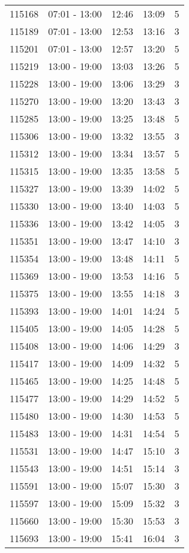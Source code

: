 \documentclass{article}
\begin{document}
\begin{tabular}{llccc}
115168 & 07:01 - 13:00 & 12:46 & 13:09 & 5 \\
115189 & 07:01 - 13:00 & 12:53 & 13:16 & 3 \\
115201 & 07:01 - 13:00 & 12:57 & 13:20 & 5 \\
115219 & 13:00 - 19:00 & 13:03 & 13:26 & 5 \\
115228 & 13:00 - 19:00 & 13:06 & 13:29 & 3 \\
115270 & 13:00 - 19:00 & 13:20 & 13:43 & 3 \\
115285 & 13:00 - 19:00 & 13:25 & 13:48 & 5 \\
115306 & 13:00 - 19:00 & 13:32 & 13:55 & 3 \\
115312 & 13:00 - 19:00 & 13:34 & 13:57 & 5 \\
115315 & 13:00 - 19:00 & 13:35 & 13:58 & 5 \\
115327 & 13:00 - 19:00 & 13:39 & 14:02 & 5 \\
115330 & 13:00 - 19:00 & 13:40 & 14:03 & 5 \\
115336 & 13:00 - 19:00 & 13:42 & 14:05 & 3 \\
115351 & 13:00 - 19:00 & 13:47 & 14:10 & 3 \\
115354 & 13:00 - 19:00 & 13:48 & 14:11 & 5 \\
115369 & 13:00 - 19:00 & 13:53 & 14:16 & 5 \\
115375 & 13:00 - 19:00 & 13:55 & 14:18 & 3 \\
115393 & 13:00 - 19:00 & 14:01 & 14:24 & 5 \\
115405 & 13:00 - 19:00 & 14:05 & 14:28 & 5 \\
115408 & 13:00 - 19:00 & 14:06 & 14:29 & 3 \\
115417 & 13:00 - 19:00 & 14:09 & 14:32 & 5 \\
115465 & 13:00 - 19:00 & 14:25 & 14:48 & 5 \\
115477 & 13:00 - 19:00 & 14:29 & 14:52 & 5 \\
115480 & 13:00 - 19:00 & 14:30 & 14:53 & 5 \\
115483 & 13:00 - 19:00 & 14:31 & 14:54 & 5 \\
115531 & 13:00 - 19:00 & 14:47 & 15:10 & 3 \\
115543 & 13:00 - 19:00 & 14:51 & 15:14 & 3 \\
115591 & 13:00 - 19:00 & 15:07 & 15:30 & 3 \\
115597 & 13:00 - 19:00 & 15:09 & 15:32 & 3 \\
115660 & 13:00 - 19:00 & 15:30 & 15:53 & 3 \\
115693 & 13:00 - 19:00 & 15:41 & 16:04 & 3 \\

\end{tabular}
\end{document}
